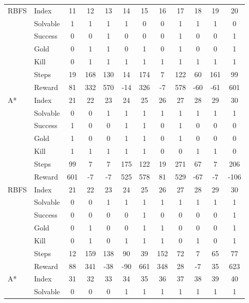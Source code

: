 \begin{table}[!h]
{\begin{tabular}{|l|l|c|c|c|c|c|c|c|c|c|c|}
		RBFS & Index & 11 & 12 & 13 & 14 & 15 & 16 & 17 & 18 & 19 & 20 \\ \cline{2-12}
		 & Solvable & 1 & 1 & 1 & 1 & 0 & 0 & 1 & 1 & 1 & 0 \\ \cline{2-12}
		 & Success & 0 & 0 & 1 & 0 & 0 & 0 & 1 & 0 & 0 & 1 \\ \cline{2-12}
		 & Gold & 0 & 1 & 1 & 0 & 1 & 0 & 1 & 0 & 0 & 1 \\ \cline{2-12}
		 & Kill & 0 & 1 & 1 & 1 & 1 & 1 & 1 & 1 & 1 & 1 \\ \cline{2-12}
		 & Steps & 19 & 168 & 130 & 14 & 174 & 7 & 122 & 60 & 161 & 99 \\ \cline{2-12}
		 & Reward & 81 & 332 & 570 & -14 & 326 & -7 & 578 & -60 & -61 & 601 \\ \cline{2-12}
		\hline
		\hline
		A* & Index & 21 & 22 & 23 & 24 & 25 & 26 & 27 & 28 & 29 & 30 \\ \cline{2-12}
		 & Solvable & 0 & 0 & 1 & 1 & 1 & 1 & 1 & 1 & 1 & 1 \\ \cline{2-12}
		 & Success & 1 & 0 & 0 & 1 & 1 & 0 & 1 & 0 & 0 & 0 \\ \cline{2-12}
		 & Gold & 1 & 0 & 0 & 1 & 1 & 0 & 1 & 0 & 0 & 0 \\ \cline{2-12}
		 & Kill & 1 & 1 & 1 & 1 & 1 & 0 & 0 & 1 & 1 & 0 \\ \cline{2-12}
		 & Steps & 99 & 7 & 7 & 175 & 122 & 19 & 271 & 67 & 7 & 206 \\ \cline{2-12}
		 & Reward & 601 & -7 & -7 & 525 & 578 & 81 & 529 & -67 & -7 & -106 \\ \cline{2-12}
		\hline
		RBFS & Index & 21 & 22 & 23 & 24 & 25 & 26 & 27 & 28 & 29 & 30 \\ \cline{2-12}
		 & Solvable & 0 & 0 & 1 & 1 & 1 & 1 & 1 & 1 & 1 & 1 \\ \cline{2-12}
		 & Success & 0 & 0 & 0 & 0 & 1 & 0 & 0 & 0 & 0 & 1 \\ \cline{2-12}
		 & Gold & 0 & 1 & 0 & 0 & 1 & 1 & 0 & 0 & 0 & 1 \\ \cline{2-12}
		 & Kill & 0 & 1 & 0 & 1 & 1 & 1 & 0 & 1 & 0 & 1 \\ \cline{2-12}
		 & Steps & 12 & 159 & 138 & 90 & 39 & 152 & 72 & 7 & 65 & 77 \\ \cline{2-12}
		 & Reward & 88 & 341 & -38 & -90 & 661 & 348 & 28 & -7 & 35 & 623 \\ \cline{2-12}
		\hline
		\hline
		A* & Index & 31 & 32 & 33 & 34 & 35 & 36 & 37 & 38 & 39 & 40 \\ \cline{2-12}
		 & Solvable & 0 & 0 & 0 & 1 & 1 & 1 & 1 & 1 & 1 & 1 \\ \cline{2-12}

\end{tabular}}
\end{table}
